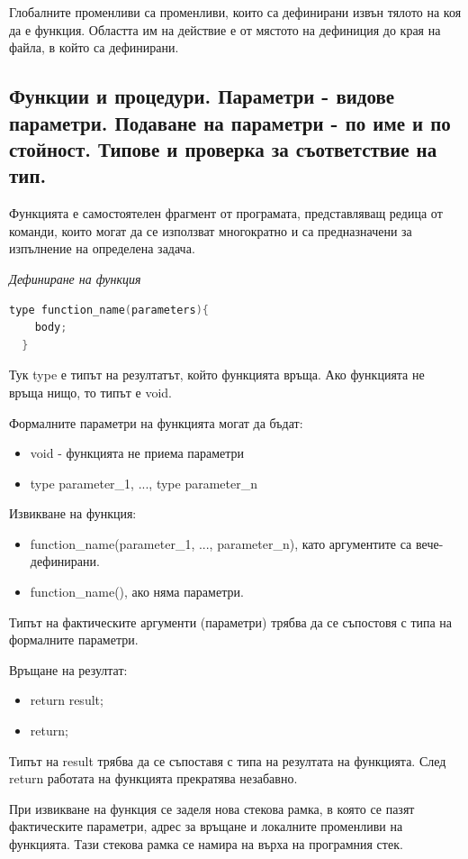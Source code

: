 \documentclass{article}
\renewcommand{\\}{\newline}
\begin{document}
Глобалните променливи са променливи, които са дефинирани извън тялото на коя да е функция. Областта им на действие е от мястото на дефиниция до края на файла, в който са дефинирани.

\subsection{Функции и процедури. Параметри - видове параметри. Подаване на параметри - по име и по стойност. Типове и проверка за съответствие на тип.}

Функцията е самостоятелен фрагмент от програмата, представляващ редица от команди, които могат да се използват многократно и са предназначени за изпълнение на определена задача.

\textit{Дефиниране на функция}
\begin{lstlisting}[language=C++]
  type function_name(parameters){
    body;
  }
\end{lstlisting}

Тук type е типът на резултатът, който функцията връща. Ако функцията не връща нищо, то типът е void.

Формалните параметри на функцията могат да бъдат:
\begin{itemize}
    \item void - функцията не приема параметри
    \item type parameter\_1, ..., type parameter\_n
\end{itemize}

Извикване на функция:
\begin{itemize}
    \item function\_name(parameter\_1, ..., parameter\_n), като аргументите са вече-дефинирани.
    \item function\_name(), ако няма параметри.
\end{itemize}

Типът на фактическите аргументи (параметри) трябва да се съпостовя с типа на формалните параметри.

Връщане на резултат: 
\begin{itemize}
    \item return result;
    \item return;
\end{itemize}

Типът на result трябва да се съпоставя с типа на резултата на функцията. След return работата на функцията прекратява незабавно.

При извикване на функция се заделя нова стекова рамка, в която се пазят фактическите параметри, адрес за връщане и локалните променливи на функцията. Тази стекова рамка се намира на върха на програмния стек. 
\end{document}
